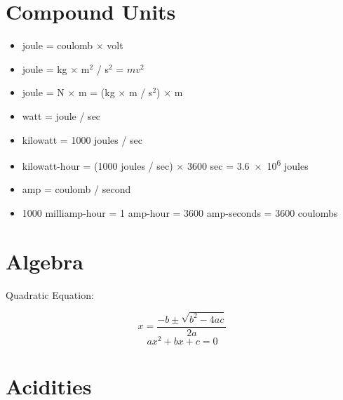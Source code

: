 \documentclass[10pt]{article}
\begin{document}
\section{Compound Units}

\begin{itemize}
    \item joule = coulomb $\times$ volt
    \item joule = kg $\times$ m$^{2}$ / s$^{2}$ = $mv^2$
    \item joule = N $\times$ m = (kg $\times$ m / s$^{2}$) $\times$ m 
    \item watt = joule / sec
    \item kilowatt = 1000 joules / sec
    \item kilowatt-hour = (1000 joules / sec) $\times$ 3600 sec = \num{3.6e6} joules
    \item amp = coulomb / second
    \item 1000 milliamp-hour = 1 amp-hour = 3600 amp-seconds = 3600 coulombs
\end{itemize}

\section{Algebra}

Quadratic Equation:

\begin{equation*}
x = \frac{-b \pm \sqrt{b^2-4ac}}{2a}
\end{equation*}
\begin{equation*}
ax^2+bx+c=0
\end{equation*}


\newpage\section{Acidities}
\end{document}
